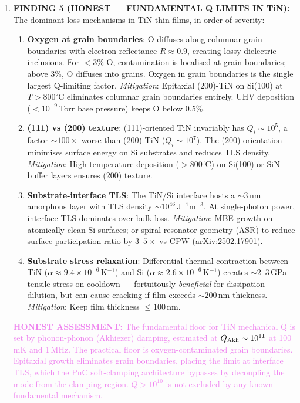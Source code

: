 \documentclass[11pt]{article}
\theoremstyle{remark}
\newcommand{\ee}[1]{\times 10^{#1}}
\newcommand{\honest}[1]{\textcolor{violet}{\textbf{HONEST ASSESSMENT:} #1}}
\begin{document}
\begin{tcolorbox}[colback=blue!5!white, colframe=blue!50!black,
  title=\textbf{W4i17 TOP 5 FINDINGS --- Ranked by Programme Impact}]
\begin{enumerate}
\item \textbf{FINDING 5 (HONEST --- FUNDAMENTAL Q LIMITS IN TiN):}
The dominant loss mechanisms in TiN thin films, in order of severity:
\begin{enumerate}[nosep,label=(\alph*)]
  \item \textbf{Oxygen at grain boundaries}: O diffuses along columnar grain
    boundaries with electron reflectance $R \approx 0.9$, creating lossy
    dielectric inclusions. For $< 3$\% O, contamination is localised at
    grain boundaries; above 3\%, O diffuses into grains. Oxygen in grain
    boundaries is the single largest Q-limiting factor.
    \emph{Mitigation}: Epitaxial (200)-TiN on Si(100) at $T > 800^\circ$C
    eliminates columnar grain boundaries entirely. UHV deposition
    ($< 10^{-9}$\,Torr base pressure) keeps O below 0.5\%.
  \item \textbf{(111) vs (200) texture}: (111)-oriented TiN invariably has
    $Q_i \sim 10^5$, a factor $\sim 100\times$ worse than (200)-TiN
    ($Q_i \sim 10^7$). The (200) orientation minimises surface energy on Si
    substrates and reduces TLS density.
    \emph{Mitigation}: High-temperature deposition ($> 800^\circ$C) on Si(100)
    or SiN buffer layers ensures (200) texture.
  \item \textbf{Substrate-interface TLS}: The TiN/Si interface hosts a
    $\sim 3$\,nm amorphous layer with TLS density $\sim 10^{46}$\,J$^{-1}$m$^{-3}$.
    At single-photon power, interface TLS dominates over bulk loss.
    \emph{Mitigation}: MBE growth on atomically clean Si surfaces; or
    spiral resonator geometry (ASR) to reduce surface participation ratio
    by $3$--$5\times$ vs CPW (arXiv:2502.17901).
  \item \textbf{Substrate stress relaxation}: Differential thermal contraction
    between TiN ($\alpha \approx 9.4\ee{-6}$\,K$^{-1}$) and Si
    ($\alpha \approx 2.6\ee{-6}$\,K$^{-1}$) creates $\sim$2--3\,GPa tensile
    stress on cooldown --- fortuitously \emph{beneficial} for dissipation
    dilution, but can cause cracking if film exceeds $\sim 200$\,nm thickness.
    \emph{Mitigation}: Keep film thickness $\leq 100$\,nm.
\end{enumerate}
\honest{The fundamental floor for TiN mechanical Q is set by phonon-phonon
(Akhiezer) damping, estimated at $Q_{\rm Akh} \sim 10^{11}$ at 100\,mK
and 1\,MHz. The practical floor is oxygen-contaminated grain boundaries.
Epitaxial growth eliminates grain boundaries, placing the limit at
interface TLS, which the PnC soft-clamping architecture bypasses by
decoupling the mode from the clamping region. $Q > 10^{10}$ is not
excluded by any known fundamental mechanism.}

\end{enumerate}
\end{tcolorbox}
\end{document}

